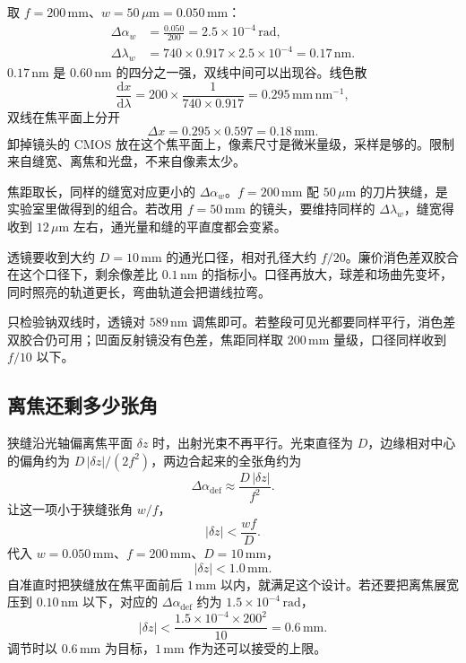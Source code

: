 \documentclass[a4paper,11pt]{ctexart}
\begin{document}
取 \(f=200\,\mathrm{mm}\)、\(w=50\,\mu\mathrm{m}=0.050\,\mathrm{mm}\)：
\begin{align}
\Delta\alpha_w &= \frac{0.050}{200} = 2.5\times 10^{-4}\,\mathrm{rad}, \\[0.3em]
\Delta\lambda_w &= 740\times 0.917\times 2.5\times 10^{-4}
= 0.17\,\mathrm{nm}.
\end{align}
\(0.17\,\mathrm{nm}\) 是 \(0.60\,\mathrm{nm}\) 的四分之一强，双线中间可以出现谷。线色散
\[
\frac{\mathrm{d}x}{\mathrm{d}\lambda}
= 200\times\frac{1}{740\times 0.917}
= 0.295\,\mathrm{mm\,nm^{-1}},
\]
双线在焦平面上分开
\[
\Delta x = 0.295\times 0.597 = 0.18\,\mathrm{mm}.
\]
卸掉镜头的 CMOS 放在这个焦平面上，像素尺寸是微米量级，采样是够的。限制来自缝宽、离焦和光盘，不来自像素太少。

焦距取长，同样的缝宽对应更小的 \(\Delta\alpha_w\)。\(f=200\,\mathrm{mm}\) 配 \(50\,\mu\mathrm{m}\) 的刀片狭缝，是实验室里做得到的组合。若改用 \(f=50\,\mathrm{mm}\) 的镜头，要维持同样的 \(\Delta\lambda_w\)，缝宽得收到 \(12\,\mu\mathrm{m}\) 左右，通光量和缝的平直度都会变紧。

透镜要收到大约 \(D=10\,\mathrm{mm}\) 的通光口径，相对孔径大约 \(f/20\)。廉价消色差双胶合在这个口径下，剩余像差比 \(0.1\,\mathrm{nm}\) 的指标小。口径再放大，球差和场曲先变坏，同时照亮的轨道更长，弯曲轨道会把谱线拉弯。

只检验钠双线时，透镜对 \(589\,\mathrm{nm}\) 调焦即可。若整段可见光都要同样平行，消色差双胶合仍可用；凹面反射镜没有色差，焦距同样取 \(200\,\mathrm{mm}\) 量级，口径同样收到 \(f/10\) 以下。

\subsection{离焦还剩多少张角}

狭缝沿光轴偏离焦平面 \(\delta z\) 时，出射光束不再平行。光束直径为 \(D\)，边缘相对中心的偏角约为 \(D\,|\delta z|/(2f^2)\)，两边合起来的全张角约为
\begin{equation}
\label{eq:defocus}
\Delta\alpha_{\mathrm{def}} \approx \frac{D\,|\delta z|}{f^2}.
\end{equation}
让这一项小于狭缝张角 \(w/f\)，
\begin{equation}
\label{eq:tolerance}
|\delta z| < \frac{w f}{D}.
\end{equation}
代入 \(w=0.050\,\mathrm{mm}\)、\(f=200\,\mathrm{mm}\)、\(D=10\,\mathrm{mm}\)，
\[
|\delta z| < 1.0\,\mathrm{mm}.
\]
自准直时把狭缝放在焦平面前后 \(1\,\mathrm{mm}\) 以内，就满足这个设计。若还要把离焦展宽压到 \(0.10\,\mathrm{nm}\) 以下，对应的 \(\Delta\alpha_{\mathrm{def}}\) 约为 \(1.5\times 10^{-4}\,\mathrm{rad}\)，
\[
|\delta z|
< \frac{1.5\times 10^{-4}\times 200^2}{10}
= 0.6\,\mathrm{mm}.
\]
调节时以 \(0.6\,\mathrm{mm}\) 为目标，\(1\,\mathrm{mm}\) 作为还可以接受的上限。
\end{document}
